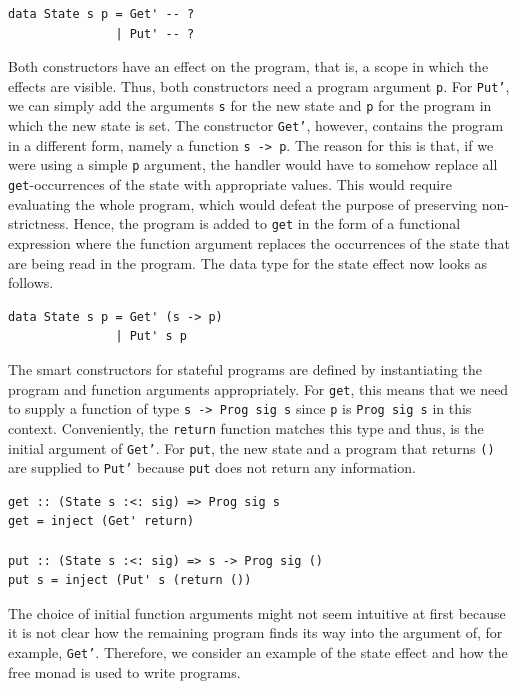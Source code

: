 \documentclass[a4paper, 11pt, fleqn, twoside, abstract=on]{scrreprt}
\newcommand{\hinl}[1]{\texttt{#1}}
\begin{document}
\begin{verbatim}
data State s p = Get' -- ?
               | Put' -- ?
\end{verbatim}

Both constructors have an effect on the program, that is, a scope in which the effects are visible.
Thus, both constructors need a program argument \hinl{p}.
For \hinl{Put'}, we can simply add the arguments \hinl{s} for the new state and \hinl{p} for the program in which the new state is set.
The constructor \hinl{Get'}, however, contains the program in a different form, namely a function \hinl{s -> p}.
The reason for this is that, if we were using a simple \hinl{p} argument, the handler would have to somehow replace all \hinl{get}-occurrences of the state with appropriate values.
This would require evaluating the whole program, which would defeat the purpose of preserving non-strictness.
Hence, the program is added to \hinl{get} in the form of a functional expression where the function argument replaces the occurrences of the state that are being read in the program.
The data type for the state effect now looks as follows.

\begin{verbatim}
data State s p = Get' (s -> p)
               | Put' s p
\end{verbatim}

The smart constructors for stateful programs are defined by instantiating the program and function arguments appropriately.
For \hinl{get}, this means that we need to supply a function of type \hinl{s -> Prog sig s} since \hinl{p} is \hinl{Prog sig s} in this context.
Conveniently, the \hinl{return} function matches this type and thus, is the initial argument of \hinl{Get'}.
For \hinl{put}, the new state and a program that returns \hinl{()} are supplied to \hinl{Put'} because \hinl{put} does not return any information.

\begin{verbatim}
get :: (State s :<: sig) => Prog sig s
get = inject (Get' return)

put :: (State s :<: sig) => s -> Prog sig ()
put s = inject (Put' s (return ())
\end{verbatim}

The choice of initial function arguments might not seem intuitive at first because it is not clear how the remaining program finds its way into the argument of, for example, \hinl{Get'}.
Therefore, we consider an example of the state effect and how the free monad is used to write programs.
\end{document}
